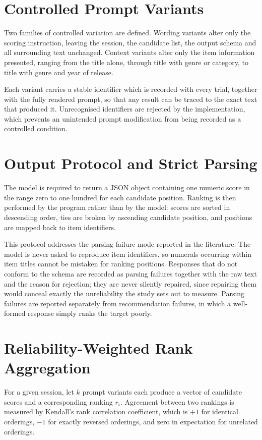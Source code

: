 \documentclass[12pt,a4paper,oneside]{report}
\begin{document}
\section{Controlled Prompt Variants}

Two families of controlled variation are defined. Wording variants alter only
the scoring instruction, leaving the session, the candidate list, the output
schema and all surrounding text unchanged. Context variants alter only the item
information presented, ranging from the title alone, through title with genre or
category, to title with genre and year of release.

Each variant carries a stable identifier which is recorded with every trial,
together with the fully rendered prompt, so that any result can be traced to the
exact text that produced it. Unrecognised identifiers are rejected by the
implementation, which prevents an unintended prompt modification from being
recorded as a controlled condition.

\section{Output Protocol and Strict Parsing}

The model is required to return a JSON object containing one numeric score in
the range zero to one hundred for each candidate position. Ranking is then
performed by the program rather than by the model: scores are sorted in
descending order, ties are broken by ascending candidate position, and positions
are mapped back to item identifiers.

This protocol addresses the parsing failure mode reported in the literature. The
model is never asked to reproduce item identifiers, so numerals occurring within
item titles cannot be mistaken for ranking positions. Responses that do not
conform to the schema are recorded as parsing failures together with the raw
text and the reason for rejection; they are never silently repaired, since
repairing them would conceal exactly the unreliability the study sets out to
measure. Parsing failures are reported separately from recommendation failures,
in which a well-formed response simply ranks the target poorly.

\section{Reliability-Weighted Rank Aggregation}

For a given session, let $k$ prompt variants each produce a vector of candidate
scores and a corresponding ranking $r_i$. Agreement between two rankings is
measured by Kendall's rank correlation coefficient, which is $+1$ for identical
orderings, $-1$ for exactly reversed orderings, and zero in expectation for
unrelated orderings.
\end{document}
